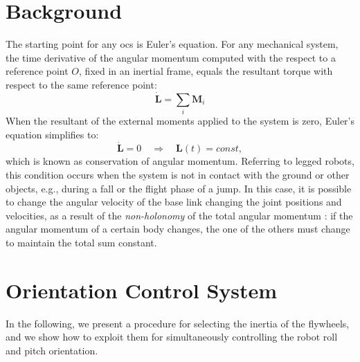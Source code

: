 \documentclass[letterpaper, 10 pt, conference]{ieeeconf}  %
\begin{document}
\section{Background}
\label{sec:background}
The starting point for any \gls{ocs} is Euler's equation. For any mechanical system, the time derivative of the angular momentum computed with the respect to a reference point $O$, fixed in an inertial frame,  equals the resultant torque with respect to the same reference point:
\begin{equation}
\dot{\bm{L}} = \sum_i \bm{M}_i
\end{equation}
When the resultant of the external moments applied to the system is zero, Euler’s equation simplifies to:
\begin{equation}
\dot{\bm{L}} = 0 \quad \Rightarrow \quad \bm{L}(t) = const,
\label{eq:cons_ang_mom}
\end{equation}
which is known as conservation of angular momentum.
Referring to legged robots, this condition occurs when the system is not in contact with the ground or other objects, e.g., during a fall or the flight phase of a jump.
In this case, it is possible to change the angular velocity of the base link changing the joint positions and velocities, as a result of the \textit{non-holonomy} of the total angular momentum \cite{Wieber16}: if the angular momentum of a certain body changes, the one of the others must change to maintain the total sum constant.

\section{Orientation Control System}
\label{sec:ocs}
In the following, we present a procedure for selecting the inertia of the flywheels, and we show how to exploit them for simultaneously controlling the robot roll and pitch orientation.
\end{document}
